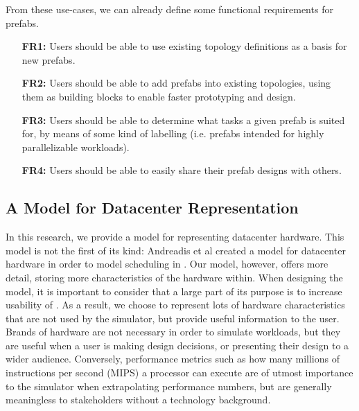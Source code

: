 \documentclass[11pt]{article}
\begin{document}
		From these use-cases, we can already define some functional requirements for prefabs.
		\begin{itemize}
			\item [\textbf{FR1:}] Users should be able to use existing topology definitions as a basis for new prefabs.
			\item [\textbf{FR2:}] Users should be able to add prefabs into existing topologies, using them as building blocks to enable faster prototyping and design.
			\item [\textbf{FR3:}] Users should be able to determine what tasks a given prefab is suited for, by means of some kind of labelling (i.e. prefabs intended for highly parallelizable workloads).
			\item [\textbf{FR4:}] Users should be able to easily share their prefab designs with others.
		\end{itemize}


	\subsection{A Model for Datacenter Representation}
		In this research, we provide a model for representing datacenter hardware. 
		This model is not the first of its kind: Andreadis et al created a model for datacenter hardware in order to model scheduling in \opendc{} \cite{Andreadis2018}. 
		Our model, however, offers more detail, storing more characteristics of the hardware within.
		When designing the model, it is important to consider that a large part of its purpose is to increase usability of \opendc{}. 
		As a result, we choose to represent lots of hardware characteristics that are not used by the simulator, but provide useful information to the user. 
		Brands of hardware are not necessary in order to simulate workloads, but they are useful when a user is making design decisions, or presenting their design to a wider audience.
		Conversely, performance metrics such as how many millions of instructions per second (MIPS) a processor can execute are of utmost importance to the simulator when extrapolating performance numbers, but are generally meaningless to stakeholders without a technology background.
	
\end{document}
